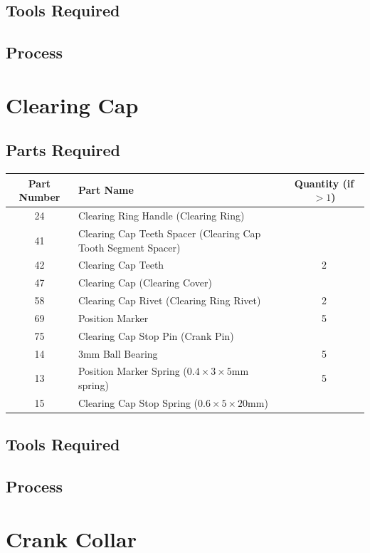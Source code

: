 \documentclass{article}
\begin{document}
\subsection{Tools Required}

\subsection{Process}


\newpage
\section{Clearing Cap}
\subsection{Parts Required}
\begin{table}[h!]
	\centering
	\begin{tabular}{clc}
		Part Number & Part Name & Quantity (if $>1$) \\ \hline
		24 & Clearing Ring Handle (Clearing Ring) & \\
		41 & Clearing Cap Teeth Spacer (Clearing Cap Tooth Segment Spacer) & \\
		42 & Clearing Cap Teeth & 2 \\
		47 & Clearing Cap (Clearing Cover) & \\
		58 & Clearing Cap Rivet (Clearing Ring Rivet) & 2 \\
		69 & Position Marker & 5 \\
		75 & Clearing Cap Stop Pin (Crank Pin) & \\ \hline \hline
		14 & 3mm Ball Bearing & 5 \\
		13 & Position Marker Spring ($0.4\times3\times5$mm spring) & 5 \\
		15 & Clearing Cap Stop Spring ($0.6\times5\times20$mm) &
	\end{tabular}
\end{table}

\subsection{Tools Required}

\subsection{Process}


\newpage
\section{Crank Collar}
\end{document}
